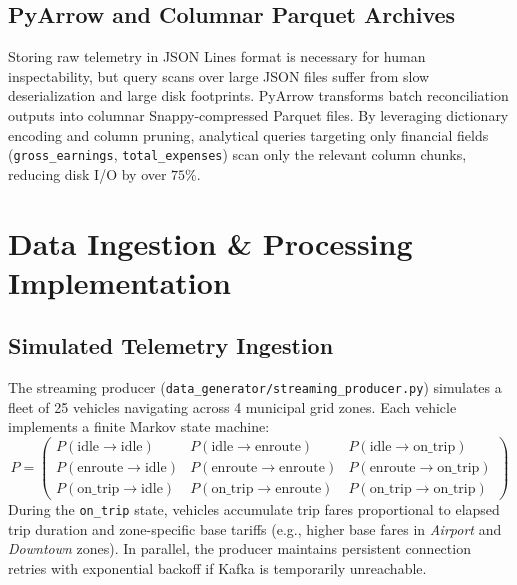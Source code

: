\documentclass[11pt,a4paper]{article}
\begin{document}
\subsection{PyArrow and Columnar Parquet Archives}
Storing raw telemetry in JSON Lines format is necessary for human inspectability, but query scans over large JSON files suffer from slow deserialization and large disk footprints. PyArrow transforms batch reconciliation outputs into columnar Snappy-compressed Parquet files. By leveraging dictionary encoding and column pruning, analytical queries targeting only financial fields (\texttt{gross\_earnings}, \texttt{total\_expenses}) scan only the relevant column chunks, reducing disk I/O by over $75\%$.

\clearpage
\section{Data Ingestion \& Processing Implementation}
\subsection{Simulated Telemetry Ingestion}
The streaming producer (\texttt{data\_generator/streaming\_producer.py}) simulates a fleet of 25 vehicles navigating across 4 municipal grid zones. Each vehicle implements a finite Markov state machine:
\begin{equation}
    P = \begin{pmatrix}
        P(\text{idle} \to \text{idle}) & P(\text{idle} \to \text{enroute}) & P(\text{idle} \to \text{on\_trip}) \\
        P(\text{enroute} \to \text{idle}) & P(\text{enroute} \to \text{enroute}) & P(\text{enroute} \to \text{on\_trip}) \\
        P(\text{on\_trip} \to \text{idle}) & P(\text{on\_trip} \to \text{enroute}) & P(\text{on\_trip} \to \text{on\_trip})
    \end{pmatrix}
\end{equation}
During the \texttt{on\_trip} state, vehicles accumulate trip fares proportional to elapsed trip duration and zone-specific base tariffs (e.g., higher base fares in \textit{Airport} and \textit{Downtown} zones). In parallel, the producer maintains persistent connection retries with exponential backoff if Kafka is temporarily unreachable.
\end{document}
